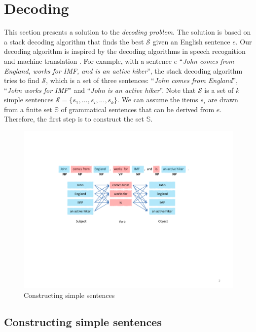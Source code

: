\documentclass[10pt]{article}
\begin{document}
\section{Decoding}
\label{sec:Decoding}

This section presents a solution to the \textit{decoding problem}. 
The solution is based on a stack decoding algorithm that finds the best $\mathcal{S}$ given an English sentence $e$.
Our decoding algorithm is inspired by the decoding algorithms in speech recognition and machine translation \cite{Jelinek:1998,moses2007}.
For example, with a sentence $e$ ``\textit{John comes from England, works for IMF, and is an active hiker}'', the stack decoding algorithm tries to find $\mathcal{S}$, which is a set of three sentences: ``\textit{John comes from England}'', ``\textit{John works for IMF}'' and  ``\textit{John is an active hiker}''.
Note that $\mathcal{S}$ is a set of $k$ simple sentences $\mathcal{S} = \{s_1, ...,s_i, ..., s_k\}$. 
We can assume the items $s_i$ are drawn from a finite set $\mathbb{S}$ of grammatical sentences that can be derived from $e$. 
Therefore, the first step is to construct the set $\mathbb{S}$.

\begin{figure}[t]
	\centering
	\includegraphics[scale=0.5]{figs/construct-simple-sents.pdf} 
	\caption{Constructing simple sentences}	
	\label{fig::ConstructSimpleSents}
\end{figure}


\subsection{Constructing simple sentences} 
\end{document}

